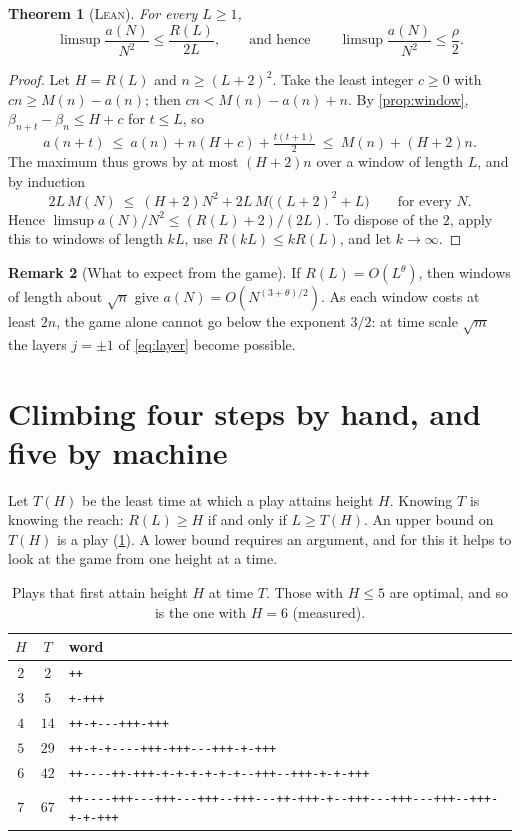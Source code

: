 \documentclass[11pt]{amsart}
\newtheorem{theorem}{Theorem}[section]
\theoremstyle{definition}
\newtheorem{remark}[theorem]{Remark}
\newcommand{\LEAN}{\textsc{Lean}}
\begin{document}
\begin{theorem}[\LEAN]\label{thm:growth}
For every $L\ge1$,
\[ \limsup\frac{a(N)}{N^2}\le\frac{R(L)}{2L},\qquad\text{and hence}\qquad\limsup\frac{a(N)}{N^2}\le\frac\rho2 . \]
\end{theorem}

\begin{proof}
Let $H=R(L)$ and $n\ge(L+2)^2$. Take the least integer $c\ge0$ with $cn\ge M(n)-a(n)$; then $cn<M(n)-a(n)+n$. By
\cref{prop:window}, $\beta_{n+t}-\beta_n\le H+c$ for $t\le L$, so
\[ a(n+t)\ \le\ a(n)+n(H+c)+\tfrac{t(t+1)}2\ \le\ M(n)+(H+2)n. \]
The maximum thus grows by at most $(H+2)n$ over a window of length $L$, and by induction
\[
  2L\,M(N)\ \le\ (H+2)N^2+2L\,M\big((L+2)^2+L\big)\qquad\text{for every }N .
\]
Hence $\limsup a(N)/N^2\le(R(L)+2)/(2L)$. To dispose of the $2$, apply this to windows of length $kL$, use $R(kL)\le kR(L)$, and let $k\to\infty$.
\end{proof}

\begin{remark}[What to expect from the game]\label{rem:exponent}
If $R(L)=O(L^\theta)$, then windows of length about $\sqrt n$ give $a(N)=O(N^{(3+\theta)/2})$. As each
window costs at least $2n$, the game alone cannot go below the exponent $3/2$: at time scale $\sqrt m$ the
layers $j=\pm1$ of \eqref{eq:layer} become possible.
\end{remark}

\section{Climbing four steps by hand, and five by machine}\label{sec:values}

Let $T(H)$ be the least time at which a play attains height $H$. Knowing $T$ is knowing the reach: $R(L)\ge H$ if and only if $L\ge T(H)$. An upper bound on $T(H)$ is a play
(\cref{tab:plays}). A lower bound requires an argument, and for this it helps to look at the game from one height at a time.

\begin{table}[H]
\centering
\caption{Plays that first attain height $H$ at time $T$. Those with $H\le5$ are optimal, and so is the one with $H=6$ (measured).}
\label{tab:plays}
\small\begin{tabular}{@{}cc l@{}}
\toprule
$H$ & $T$ & word \\
\midrule
$2$ & $2$ & \texttt{++} \\
$3$ & $5$ & \texttt{+-+++} \\
$4$ & $14$ & \texttt{++-+{}-{}-{}-+++-+++} \\
$5$ & $29$ & \texttt{++-+-+{}-{}-{}-{}-+++-+++{}-{}-{}-+++-+-+++} \\
$6$ & $42$ & \texttt{++{}-{}-{}-{}-++-+++-+-+-+-+-+-+{}-{}-+++{}-{}-+++-+-+-+++} \\
$7$ & $67$ & \texttt{++{}-{}-{}-{}-+++{}-{}-{}-+++{}-{}-{}-+++{}-{}-+++{}-{}-{}-++-+++-+{}-{}-+++{}-{}-{}-+++{}-{}-{}-+++{}-{}-+++-+-+-+++} \\
\bottomrule
\end{tabular}
\end{table}
\end{document}

